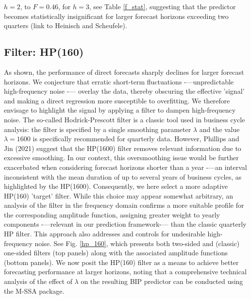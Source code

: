 \documentclass[a4paper]{article}
\begin{document}
$h=2$, to $F=0.46$, for $h=3$, see Table \eqref{f_stat}, suggesting that the predictor becomes statistically insignificant for larger forecast horizons exceeding two quarters (link to Heinisch and Scheufele).   


\subsection{Filter: HP(160)}

As shown, the performance of direct forecasts sharply declines for larger forecast horizons. We conjecture that erratic short-term fluctuations -—unpredictable high-frequency noise -— overlay the data, thereby obscuring the effective 'signal' and making a direct regression more susceptible to overfitting. We therefore envisage to highlight the signal by applying a filter to dampen high-frequency noise. 
The so-called Hodrick-Prescott filter is a classic tool used in business cycle analysis: the filter is specified by a single smoothing parameter $\lambda$ and the value $\lambda=1600$ is specifically recommended for quarterly data. However, Phillips and Jin (2021) suggest that the HP(1600) filter removes relevant information due to excessive smoothing.  In our context, this oversmoothing issue would be further exacerbated when considering forecast horizons shorter than a year -—an interval inconsistent with the mean duration of up to several years of business cycles, as highlighted by the HP(1600). Consequently, we here select a more adaptive HP(160) 'target' filter. 
While this choice may appear somewhat arbitrary, an analysis of the filter in the frequency domain confirms a more suitable profile for the corresponding amplitude function, assigning greater weight to yearly components -—relevant in our prediction framework-— than the classic quarterly HP filter. This approach also addresses and controls for undesirable high-frequency noise. See Fig. \ref{hp_160}, which presents both two-sided and (classic) one-sided filters (top panels) along with the associated amplitude functions (bottom panels). We now posit the HP(160) filter as a means to achieve better forecasting performance at larger horizons, noting that a comprehensive technical analysis of the effect of $\lambda$ on the resulting BIP predictor can be conducted using the M-SSA package. 
\end{document}
